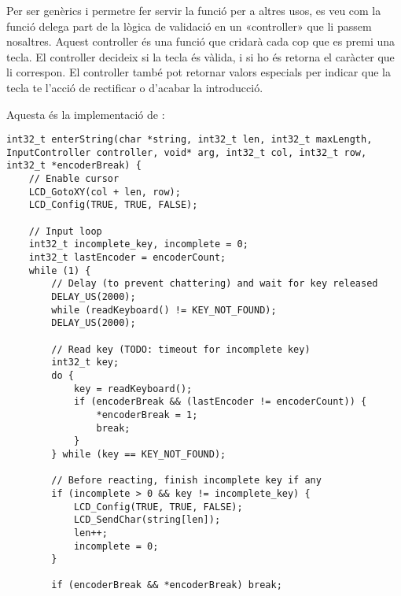 Per ser genèrics i permetre fer servir la funció per a altres usos, es veu com la funció
delega part de la lògica de validació en un «controller» que li passem nosaltres. Aquest
controller és una funció que  cridarà cada cop que es premi una tecla.
El controller decideix si la tecla és vàlida, i si ho és retorna el caràcter que li correspon.
El controller també pot retornar valors especials per indicar que la tecla te l'acció de
rectificar o d'acabar la introducció.

Aquesta és la implementació de :

\begin{verbatim}
int32_t enterString(char *string, int32_t len, int32_t maxLength, InputController controller, void* arg, int32_t col, int32_t row, int32_t *encoderBreak) {
    // Enable cursor
    LCD_GotoXY(col + len, row);
    LCD_Config(TRUE, TRUE, FALSE);

    // Input loop
    int32_t incomplete_key, incomplete = 0;
    int32_t lastEncoder = encoderCount;
    while (1) {
        // Delay (to prevent chattering) and wait for key released
        DELAY_US(2000);
        while (readKeyboard() != KEY_NOT_FOUND);
        DELAY_US(2000);

        // Read key (TODO: timeout for incomplete key)
        int32_t key;
        do {
            key = readKeyboard();
            if (encoderBreak && (lastEncoder != encoderCount)) {
                *encoderBreak = 1;
                break;
            }
        } while (key == KEY_NOT_FOUND);

        // Before reacting, finish incomplete key if any
        if (incomplete > 0 && key != incomplete_key) {
            LCD_Config(TRUE, TRUE, FALSE);
            LCD_SendChar(string[len]);
            len++;
            incomplete = 0;
        }

        if (encoderBreak && *encoderBreak) break;


\end{verbatim}

